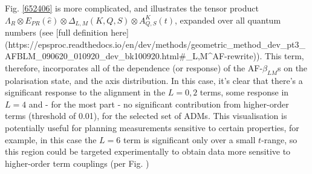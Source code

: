 Fig. \ref{652406} is more complicated, and illustrates the tensor product $\Lambda_{R}\otimes E_{PR}(\hat{e})\otimes \Delta_{L,M}(K,Q,S)\otimes A^{K}_{Q,S}(t)$, expanded over all quantum numbers (see [full definition here](https://epsproc.readthedocs.io/en/dev/methods/geometric_method_dev_pt3_AFBLM_090620_010920_dev_bk100920.html#\beta_{L,M}^{AF}-rewrite)). This term, therefore, incorporates all of the dependence (or response) of the AF-$\beta_{LM}$s on the polarisation state, and the axis distribution. In this case, it's clear that there's a significant response to the alignment in the $L=0,2$ terms, some response in $L=4$ and - for the most part - no significant contribution from higher-order terms (threshold of 0.01), for the selected set of ADMs. This visualisation is potentially useful for planning measurements sensitive to certain properties, for example, in this case the $L=6$ term is significant only over a small $t$-range, so this region could be targeted experimentally to obtain data more sensitive to higher-order term couplings (per Fig. )
